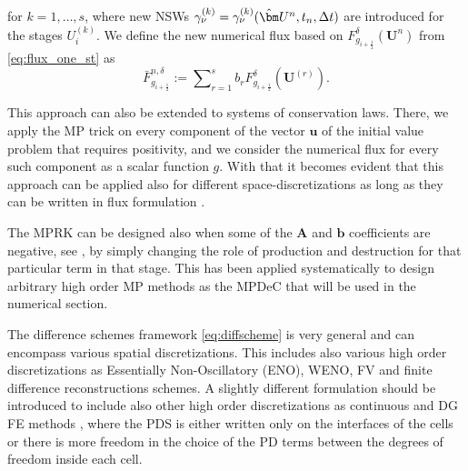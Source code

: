 \documentclass[final,11pt, times, linenumber, nopreprintline]{elsarticle}
\newcommand{\TI}[1]{{\color{red}#1}}
\newcommand{\bU}{\bm U}
\newcommand{\bF}{\bar{F}}
\begin{document}
for $k=1,\dots,s$, where new NSWs $\gamma_\nu^{(k)}= \gamma_\nu^{(k)}(\hat\bU^n,t_n, \Delta t)$ are introduced for the stages $U_i^{(k)}$.
We define the new numerical flux based on $F^{\delta}_{g_{i+\frac{1}{2}}}(\bU^n)$ from \eqref{eq:flux_one_st}  as
\begin{equation}
	\bF^{n,\delta}_{g_{i+\frac{1}{2}}} := \sum\nolimits_{r = 1}^{s}b_r F^{\delta}_{g_{i+\frac{1}{2}}}(\bU^{(r)}) .
	\label{eq:sum_flux}
\end{equation}

\begin{rmk}
	This approach can also be extended to systems of conservation laws.
	There, we apply the MP trick on every component of the vector $\mathbf u$ of the initial value problem that requires positivity, and we consider the numerical flux  for every such component as a scalar function $g$. With that it becomes evident that this approach can be applied 
    also for different space-discretizations as long as they can be written in flux formulation \cite{abgrall2023}.
\end{rmk}

\begin{rmk}
    The MPRK can be designed also when some of the $\mathbf{A}$ and $\mathbf b$ coefficients are negative, see \cite{kopecz_order_2018}, by simply changing the role of production and destruction for that particular term in that stage. This has been applied systematically to design arbitrary high order MP methods as the MPDeC \cite{offner2020arbitrary} that will be used in the numerical section.
\end{rmk}

\begin{rmk}
    The difference schemes framework \eqref{eq:diffscheme} is very general and can encompass various spatial discretizations. This includes also various high order discretizations as Essentially Non-Oscillatory (ENO), WENO, FV \cite{ciallella2022arbitrary,ciallella2025high} and finite difference \cite{huang_positivity-preserving_2019} reconstructions schemes. 
    A slightly different formulation should be introduced to include also other high order discretizations as continuous and DG FE methods \cite{MO2014,zhu2024bound}, where the PDS is either written only on the interfaces of the cells or there is more freedom in the choice of the PD terms between the degrees of freedom inside each cell. 
\end{rmk}
\end{document}
